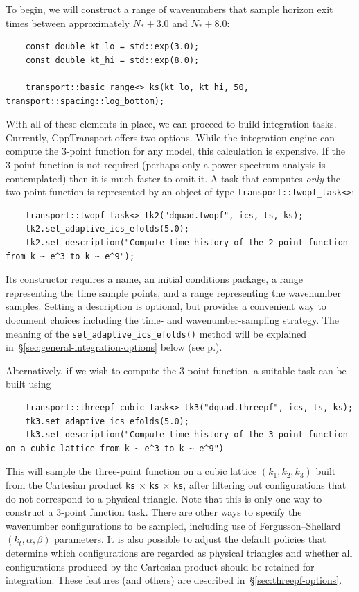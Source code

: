 \documentclass[11pt,a4paper]{article}
\newcommand{\Nstar}{N_{\ast}}
\newcommand{\packagefont}{\sffamily}
\newcommand{\CppTransport}{{\packagefont CppTransport}}
\newcommand{\semibold}[1]{{\fontseries{b}\selectfont{#1}}}
\newcommand{\para}[1]{\par\vspace{2mm}\noindent\semibold{{#1.}---}\ignorespaces}
\begin{document}
To begin, we will construct a range of wavenumbers that
sample horizon exit times between approximately
$\Nstar + 3.0$
and
$\Nstar + 8.0$:
\begin{verbatim}
    const double kt_lo = std::exp(3.0);
    const double kt_hi = std::exp(8.0);

    transport::basic_range<> ks(kt_lo, kt_hi, 50, transport::spacing::log_bottom);
\end{verbatim}

\para{Building 2- and 3-point function integration tasks}
With all of these elements in place, we can proceed to build
integration tasks.
Currently, {\CppTransport} offers two options.
While the integration
engine can compute the 3-point function for any model,
this calculation is expensive.
If the 3-point function is not required
(perhaps only a power-spectrum analysis is contemplated)
then it is much faster to omit it.
A task that computes \emph{only} the two-point function
is represented by an object of type
\texttt{transport::twopf_task<>}:
\begin{verbatim}
    transport::twopf_task<> tk2("dquad.twopf", ics, ts, ks);
    tk2.set_adaptive_ics_efolds(5.0);
    tk2.set_description("Compute time history of the 2-point function from k ~ e^3 to k ~ e^9");
\end{verbatim}
Its constructor requires a name, an initial conditions package,
a range representing the time sample points,
and a range representing the wavenumber samples.
Setting a description is optional, but provides a convenient way to document
choices including the time- and wavenumber-sampling strategy.
The meaning of the
\texttt{set_adaptive_ics_efolds()}
method will be explained in~\S\ref{sec:general-integration-options} below
(see p.\pageref{enum:adpative-ics}).

Alternatively, if we wish to compute the 3-point function,
a suitable task can be built using
\begin{verbatim}
    transport::threepf_cubic_task<> tk3("dquad.threepf", ics, ts, ks);
    tk3.set_adaptive_ics_efolds(5.0);
    tk3.set_description("Compute time history of the 3-point function on a cubic lattice from k ~ e^3 to k ~ e^9")
\end{verbatim}
This will sample the three-point function on a cubic lattice
$(k_1, k_2, k_3)$ built from the Cartesian product
\texttt{ks} $\times$
\texttt{ks} $\times$
\texttt{ks},
after filtering out configurations that do not correspond to
a physical triangle.
Note that
this is only one way to construct a 3-point function task.
There are other ways to specify the wavenumber configurations
to be sampled, including use of
Fergusson--Shellard $(k_t, \alpha, \beta)$ parameters.
It is also possible to adjust the default
policies that determine which configurations
are regarded as physical triangles and whether all
configurations produced by the Cartesian product should
be retained for integration.
These features (and others) are described in~\S\ref{sec:threepf-options}.
\end{document}
